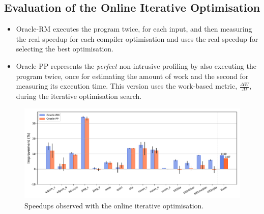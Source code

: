 \documentclass[sigplan,9pt]{acmart}
\begin{document}
\subsection{Evaluation of the Online Iterative Optimisation}

\begin{itemize}
\item Oracle-RM executes the program twice, for each input, and then measuring
the real speedup for each compiler optimisation and uses the real speedup for
selecting the best optimisation.
\item Oracle-PP represents the \textit{perfect} non-intrusive profiling by also
executing the program twice, once for estimating the amount of work and the
second for measuring its execution time.
This version uses the work-based metric, $\frac{\Delta W}{\Delta t}$, during
the iterative optimisation search.
\end{itemize}



\begin{figure}[htb]
    \centering
    \includegraphics[width=\textwidth]{figs/speedups.pdf}
    \caption{Speedups observed with the online iterative optimisation.}
    \label{fig:speedups}
\end{figure}


%
%
\end{document}
